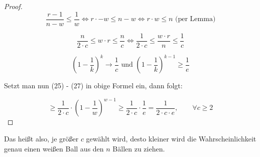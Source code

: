 \documentclass{article}
\begin{document}
\begin{proof}
  \begin{equation}
    \frac{r - 1}{n - w} \leq \frac{1}{w}
      \Longleftrightarrow r \cdot  - w \leq n - w
      \Longleftrightarrow r \cdot w \leq n \text{ (per Lemma)}
  \end{equation}

  \begin{equation}
    \frac{n}{2 \cdot c} \leq w \cdot r \leq \frac{n}{c}
      \Longleftrightarrow \frac{1}{2 \cdot c} \leq \frac{w \cdot r}{n} \leq \frac{1}{c}
  \end{equation}

  \begin{equation}
    \left( 1 - \frac{1}{k} \right)^k \rightarrow \frac{1}{c} \text{ und }
    \left( 1 - \frac{1}{k} \right)^{k - 1} \geq \frac{1}{e}
  \end{equation}

  \bigskip
  \noindent
  Setzt man nun (25) - (27) in obige Formel ein, dann folgt:

  \begin{equation}
    \geq \frac{1}{2 \cdot c} \cdot \left( 1 - \frac{1}{w} \right)^{w - 1}
    \geq \frac{1}{2 \cdot c} \cdot \frac{1}{e} = \frac{1}{2 \cdot c \cdot e},
    \qquad \forall c \geq 2
  \end{equation}
\end{proof}

\noindent
Das hei{\ss}t also, je gr{\"o}{\ss}er $c$ gew{\"a}hlt wird, desto kleiner wird die
Wahrscheinlichkeit genau einen wei{\ss}en Ball aus den $n$ B{\"a}llen zu ziehen.
\end{document}
